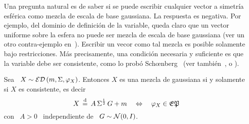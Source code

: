 Una  pregunta natural  es  de saber  si  se puede  escribir  cualquier vector  a
simetr\'ia esf\'erica como mezcla de  escala de base gaussiana.  La respuesta es
negativa. Por ejemplo,  del dominio de definici\'on de  la variable, queda claro
que un  vector uniforme sobre la  esfera no puede  ser mezcla de escala  de base
gaussiana (ver un otro  contra-ejemplo en~\cite{Pic70}).  Escribir un vecor como
tal  mezcla es posible  solamente bajo  restricciones.  M\'as  precisamente, una
condici\'on necesaria y suficiente es que la variable debe ser consistente, como
lo           prob\'o           Sch{\oe}nberg~\cite[Teo.~2]{Sch38}           (ver
tambi\'en~\cite[Teo.~2]{SteVan05},            \cite[Lem.~2.2]{Yao73}           o
\cite[Teo.~1]{Kan94}).
%
\begin{teorema}
\label{Teo:MP:SchoenbergCaracteristica}
%
Sea \ $X  \sim \mathcal{ED}\left( m ,  \Sigma , \varphi_X \right)$.  Entonces  $X$ es una
mezcla de gaussiana si y solamente si $X$ es consistente, es decir
  \[
  X \,  \stackrel{\mathrm{d}}{=} \,  A \, \Sigma^{\frac12}  \, G  + m \quad  \Leftrightarrow \quad
  \varphi_X \in \mathfrak{EP}
  \]
  con \ $A > 0$ \ independiente de \ $G \sim \mathcal{N}(0,I)$.
\end{teorema}
%

